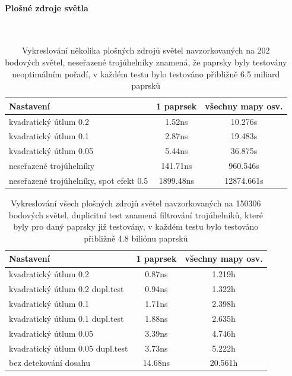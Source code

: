 \documentclass[11pt,twoside,a4paper]{book}
\begin{document}
\paragraph{Plošné zdroje světla}\ \ \\
\begin{table}[h!]
\begin{center}
\begin{tabular}{|p{80mm}|c|c|}
\hline
\textbf{Nastavení} & \textbf{1 paprsek} & \textbf{všechny mapy osv.} \\
\hline
kvadratický útlum 0.2 & 1.52ns & 10.276s\\ \hline
kvadratický útlum 0.1 & 2.87ns & 19.483s\\ \hline
kvadratický útlum 0.05 & 5.44ns & 36.875s\\ \hline
neseřazené trojúhelníky & 141.71ns & 960.546s\\ \hline
neseřazené trojúhelníky, spot efekt 0.5 & 1899.48ns & 12874.661s\\ \hline
\end{tabular}
\caption{Vykreslování několika plošných zdrojů světel navzorkovaných na 202 bodových světel, neseřazené trojúhelníky znamená, že paprsky byly testovány neoptimálním pořadí, v každém testu bylo testováno přibližně 6.5 miliard paprsků }
\end{center}
\end{table}

\begin{table}[h!]
\begin{center}
\begin{tabular}{|p{80mm}|c|c|}
\hline
\textbf{Nastavení} & \textbf{1 paprsek} & \textbf{všechny mapy osv.} \\
\hline
kvadratický útlum 0.2 & 0.87ns & 1.219h\\ \hline
kvadratický útlum 0.2 dupl.test & 0.94ns & 1.322h\\ \hline
kvadratický útlum 0.1 & 1.71ns & 2.398h\\ \hline
kvadratický útlum 0.1 dupl.test & 1.88ns & 2.635h\\ \hline
kvadratický útlum 0.05 & 3.39ns & 4.746h\\ \hline
kvadratický útlum 0.05 dupl.test & 3.73ns & 5.222h\\ \hline
bez detekování dosahu & 14.68ns & 20.561h\\ \hline
\end{tabular}
\caption{Vykreslování všech plošných zdrojů světel navzorkovaných na 150306 bodových světel, duplicitní test znamená filtrování trojúhelníků, které byly pro daný paprsky již testovány, v každém testu bylo testováno přibližně 4.8 biliónu paprsků }
\end{center}
\end{table}
\newpage
\end{document}
